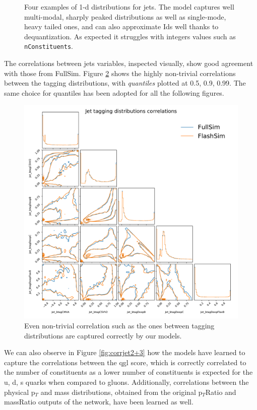 \begin{figure}
    \caption[1-d jets distributions]{Four examples of 1-d distributions for jets. The model captures well multi-modal, sharply peaked distributions as well as single-mode, heavy tailed ones, and can also approximate Ids well thanks to dequantization. As expected it struggles with integers values such as \texttt{nConstituents}.}\label{fig:jetsdists}
    
\end{figure}

The correlations between jets variables, inspected visually, show good agreement with those from FullSim. Figure \ref{fig:corrjet1} shows the highly non-trivial correlations between the tagging distributions, with \emph{quantiles} plotted at 0.5, 0.9, 0.99. The same choice for quantiles has been adopted for all the following figures.

\begin{figure}
    \centering
    \includegraphics[width=1.2\linewidth]{gfx/ch5/corrjet1.pdf}
    \caption[Tagging correlations]{Even non-trivial correlation such as the ones between tagging distributions are captured correctly by our models.}
    \label{fig:corrjet1}
\end{figure}

We can also observe in Figure \ref{fig:corrjet2+3} how the models have learned to capture the correlations between the qgl score, which is correctly correlated to the number of constituents as a lower number of constituents is expected for the u, d, s quarks when compared to gluons. Additionally, correlations between the physical p$_T$ and mass distributions, obtained from the original p$_T$Ratio and massRatio outputs of the network, have been learned as well.

